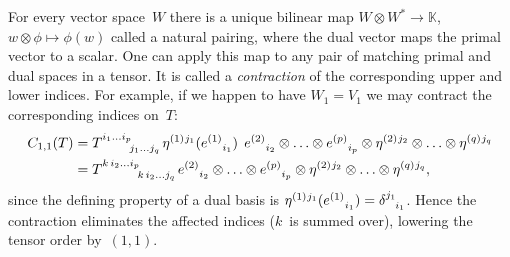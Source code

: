 \documentclass[aps,pra,12pt,nofootinbib,superscriptaddress,longbibliography]{revtex4-1}
\theoremstyle{plain}
\theoremstyle{definition}
\newcommand{\K}{{\mathbb K}}  %
\newcommand{\spidx}[3]{^{(#1)}{}\indices{^{#2}_{#3}}}
\newcommand{\bv}{e}     %
\newcommand{\dv}{\eta}  %
\begin{document}
For every vector space~$W$ there is a unique bilinear map
$W \otimes W^* \to \K$,
$w \otimes \phi \mapsto \phi(w)$
called a natural pairing,
where the dual vector maps the primal vector to a scalar.
One can apply this map to any pair of matching primal and dual spaces in a tensor.
It is called a \emph{contraction} of the corresponding upper and lower indices.
For example, if we happen to have $W_1 = V_1$ we may contract the corresponding indices on~$T$:
\begin{align}
\notag
C_{1,1}(T)
&=
T\indices{^{i_1 \ldots i_p}_{j_1 \ldots j_q}}
\dv\spidx{1}{j_1}{}(\bv\spidx{1}{}{i_1})
\:\:
\bv\spidx{2}{}{i_2} \otimes \ldots \otimes \bv\spidx{p}{}{i_p}
\otimes
\dv\spidx{2}{j_2}{} \otimes \ldots \otimes \dv\spidx{q}{j_q}{}\\
&=
T\indices{^{k \, i_2 \ldots i_p}_{k \, i_2 \ldots j_q}}
\bv\spidx{2}{}{i_2} \otimes \ldots \otimes \bv\spidx{p}{}{i_p}
\otimes
\dv\spidx{2}{j_2}{} \otimes \ldots \otimes \dv\spidx{q}{j_q}{},
\end{align}
since the defining property of a dual basis is
$\dv\spidx{1}{j_1}{}(\bv\spidx{1}{}{i_1}) = \delta\indices{^{j_1}_{i_1}}$.
Hence the contraction eliminates the affected indices ($k$~is summed over),
lowering the tensor order by~$(1,1)$.
\end{document}
